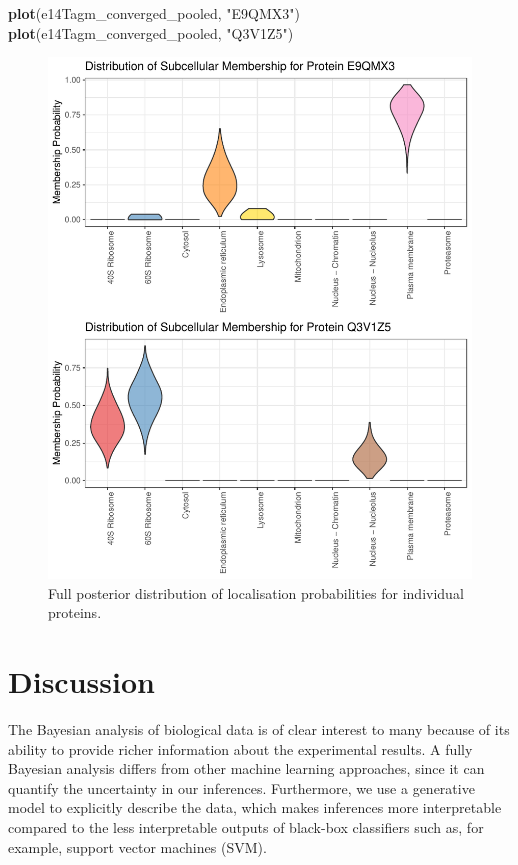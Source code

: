 \documentclass[
]{article}
\newenvironment{Shaded}{\begin{snugshade}}{\end{snugshade}}
\newcommand{\KeywordTok}[1]{\textcolor[rgb]{0.13,0.29,0.53}{\textbf{#1}}}
\newcommand{\NormalTok}[1]{#1}
\newcommand{\StringTok}[1]{\textcolor[rgb]{0.31,0.60,0.02}{#1}}
\begin{document}
\begin{Shaded}
\begin{Highlighting}[]
\KeywordTok{plot}\NormalTok{(e14Tagm_converged_pooled, }\StringTok{"E9QMX3"}\NormalTok{)}
\KeywordTok{plot}\NormalTok{(e14Tagm_converged_pooled, }\StringTok{"Q3V1Z5"}\NormalTok{)}
\end{Highlighting}
\end{Shaded}

\begin{figure}
\centering
\includegraphics{F1000TAGMworkflow_rev1_files/figure-latex/probdists1-1.pdf}
\caption{Full posterior distribution of localisation probabilities for
individual proteins.}
\end{figure}

\hypertarget{discussion}{%
\section{Discussion}\label{discussion}}

The Bayesian analysis of biological data is of clear interest to many
because of its ability to provide richer information about the
experimental results. A fully Bayesian analysis differs from other
machine learning approaches, since it can quantify the uncertainty in
our inferences. Furthermore, we use a generative model to explicitly
describe the data, which makes inferences more interpretable compared to
the less interpretable outputs of black-box classifiers such as, for
example, support vector machines (SVM).
\end{document}
